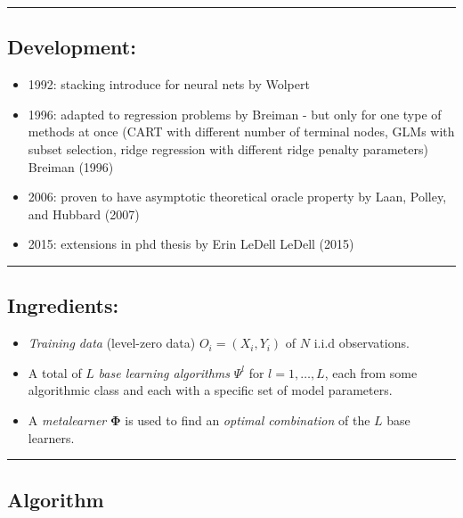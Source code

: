 \documentclass[
  letterpaper,
  DIV=11,
  numbers=noendperiod]{scrartcl}
\providecommand{\tightlist}{%
  \setlength{\itemsep}{0pt}\setlength{\parskip}{0pt}}\usepackage{longtable,booktabs,array}
\begin{document}
\begin{center}\rule{0.5\linewidth}{0.5pt}\end{center}

\hypertarget{development}{%
\subsection{Development:}\label{development}}

\begin{itemize}
\tightlist
\item
  1992: stacking introduce for neural nets by Wolpert
\item
  1996: adapted to regression problems by Breiman - but only for one
  type of methods at once (CART with different number of terminal nodes,
  GLMs with subset selection, ridge regression with different ridge
  penalty parameters) Breiman (1996)
\item
  2006: proven to have asymptotic theoretical oracle property by Laan,
  Polley, and Hubbard (2007)
\item
  2015: extensions in phd thesis by Erin LeDell LeDell (2015)
\end{itemize}

\begin{center}\rule{0.5\linewidth}{0.5pt}\end{center}

\hypertarget{ingredients}{%
\subsection{Ingredients:}\label{ingredients}}

\begin{itemize}
\item
  \emph{Training data} (level-zero data) \(O_i=(X_i,Y_i)\) of \(N\)
  i.i.d observations.
\item
  A total of \(L\) \emph{base learning algorithms} \(\Psi^l\) for
  \(l=1,\ldots,L\), each from some algorithmic class and each with a
  specific set of model parameters.
\item
  A \emph{metalearner} \({\boldsymbol \Phi}\) is used to find an
  \emph{optimal combination} of the \(L\) base learners.
\end{itemize}

\begin{center}\rule{0.5\linewidth}{0.5pt}\end{center}

\hypertarget{algorithm}{%
\subsection{Algorithm}\label{algorithm}}
\end{document}
